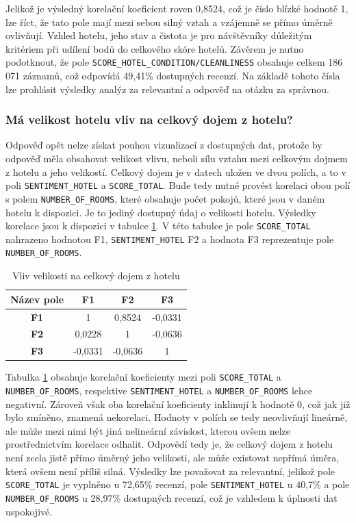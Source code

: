 \documentclass[czech,BP]{thesiskiv}
\begin{document}
Jelikož je výsledný korelační koeficient roven 0,8524, což je číslo blízké hodnotě 1, lze říct, že tato pole mají mezi sebou silný vztah a vzájemně se přímo úměrně ovlivňují. Vzhled hotelu, jeho stav a čistota je pro návštěvníky důležitým kritériem při udílení bodů do celkového skóre hotelů. Závěrem je nutno podotknout, že pole \texttt{SCORE\_HO\-TEL\_CONDITION/CLEANLINESS} obsahuje celkem 186 071 záznamů, což odpovídá 49,41\% dostupných recenzí. Na základě tohoto čísla lze prohlásit výsledky analýz za relevantní a odpověď na otázku za správnou.

\subsubsection{Má velikost hotelu vliv na celkový dojem z hotelu?}
\label{subsub:velikost hotelu}
Odpověď opět nelze získat pouhou vizualizací z dostupných dat, protože by odpověď měla obsahovat velikost vlivu, neboli sílu vztahu mezi celkovým dojmem z hotelu a jeho velikostí. Celkový dojem je v datech uložen ve dvou polích, a to v poli \texttt{SENTIMENT\_HOTEL} a \texttt{SCORE\_TOTAL}. Bude tedy nutné provést korelaci obou polí s polem \texttt{NUMBER\_OF\_ROOMS}, které obsahuje počet pokojů, které jsou v daném hotelu k dispozici. Je to jediný dostupný údaj o velikosti hotelu.  Výsledky korelace jsou k dispozici v tabulce \ref{hotel_korelace}. V této tabulce je pole \texttt{SCORE\_TOTAL} nahrazeno hodnotou F1, \texttt{SENTIMENT\_HOTEL} F2 a hodnota F3 reprezentuje pole \texttt{NUMBER\_OF\_ROOMS}.

\begin{table}[h]
	\centering

	\begin{tabular}{c|c c c}
		\hline
		\textbf{Název pole} & \textbf{F1} & \textbf{F2} & \textbf{F3} \\ \hline
		\textbf{F1}     & 1               & 0,8524          & -0,0331         \\ 
		\textbf{F2}     & 0,0228          & 1               & -0,0636         \\ 
		\textbf{F3}     & -0,0331         & -0,0636         & 1               \\ \hline
	\end{tabular}
	\caption{Vliv velikosti na celkový dojem z hotelu}
\label{hotel_korelace}
\end{table}


Tabulka \ref{hotel_korelace} obsahuje korelační koeficienty mezi poli \texttt{SCO\-RE\_TOTAL} a \texttt{NUM\-BER\_OF\_ROOMS}, respektive \texttt{SENTIMENT\_\-HOTEL} a \texttt{NUMBER\_OF\_ROOMS} lehce negativní. Zároveň však oba korelační koeficienty inklinují k hodnotě 0, což jak již bylo zmíněno, znamená nekorelaci. Hodnoty v polích se tedy neovlivňují lineárně, ale může mezi nimi být jiná nelineární závislost, kterou ovšem nelze prostřednictvím korelace odhalit. Odpovědí tedy je, že  celkový dojem z hotelu není zcela jistě přímo úměrný jeho velikosti, ale může existovat nepřímá úměra, která ovšem není příliš silná. Výsledky lze považovat za relevantní, jelikož pole \texttt{SCORE\_TOTAL} je vyplněno u 72,65\% recenzí, pole \texttt{SENTIMENT\_HOTEL} u 40,7\% a pole \texttt{NUMBER\_OF\_ROOMS} u 28,97\% dostupných recenzí, což je vzhledem k úplnosti dat uspokojivé.
\end{document}
